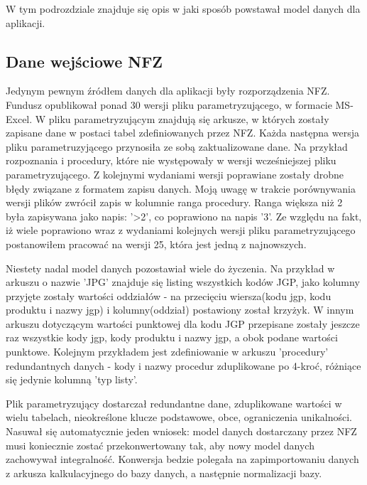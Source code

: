 W tym podrozdziale znajduje się opis w jaki sposób powstawał model danych dla aplikacji.

\subsection{Dane wejściowe NFZ}
\label{sec:daneWejscioweNFZ}
Jedynym pewnym źródłem danych dla aplikacji były rozporządzenia NFZ. Fundusz opublikował ponad 30 wersji pliku parametryzującego, w formacie MS-Excel. W pliku parametryzującym znajdują się arkusze, w których zostały zapisane dane w postaci tabel zdefiniowanych przez NFZ. Każda następna wersja pliku parametruzyjącego przynosiła ze sobą zaktualizowane dane. Na przykład rozpoznania i procedury, które nie występowały w wersji wcześniejszej pliku parametryzującego. Z kolejnymi wydaniami wersji poprawiane zostały drobne błędy związane z formatem zapisu danych. Moją uwagę w trakcie porównywania wersji plików zwrócił zapis w kolumnie ranga procedury. Ranga większa niż 2 była zapisywana jako napis: '>2', co poprawiono na napis '3'. Ze względu na fakt, iż wiele poprawiono wraz z wydaniami kolejnych wersji pliku parametryzującego postanowiłem pracować na wersji 25, która jest jedną z najnowszych. 

Niestety nadal model danych pozostawiał wiele do życzenia. Na przykład w arkuszu o nazwie 'JPG' znajduje się listing wszystkich kodów JGP, jako kolumny przyjęte zostały wartości oddziałów - na przecięciu wiersza(kodu jgp, kodu produktu i nazwy jgp) i kolumny(oddział) postawiony został krzyżyk. W innym arkuszu dotyczącym wartości punktowej dla kodu JGP przepisane zostały jeszcze raz wszystkie kody jgp, kody produktu i nazwy jgp, a obok podane wartości punktowe. Kolejnym przykładem jest zdefiniowanie w arkuszu 'procedury' redundantnych danych - kody i nazwy procedur zduplikowane po 4-kroć, różniące się jedynie kolumną 'typ listy'.

Plik parametryzujący dostarczał redundantne dane, zduplikowane wartości w wielu tabelach, nieokreślone klucze podstawowe, obce, ograniczenia unikalności. Nasuwał się automatycznie jeden wniosek: model danych dostarczany przez NFZ musi koniecznie zostać przekonwertowany tak, aby nowy model danych zachowywał integralność. Konwersja bedzie polegała na zapimportowaniu danych z arkusza kalkulacyjnego do bazy danych, a następnie normalizacji bazy.


